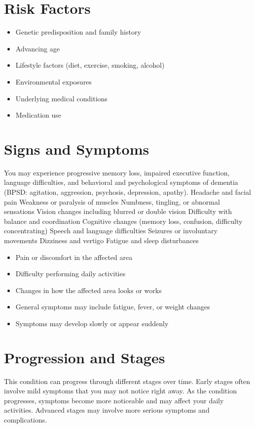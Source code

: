 \section{Risk Factors}

\begin{itemize}[noitemsep]
  \item Genetic predisposition and family history
  \item Advancing age
  \item Lifestyle factors (diet, exercise, smoking, alcohol)
  \item Environmental exposures
  \item Underlying medical conditions
  \item Medication use
\end{itemize}

\section{Signs and Symptoms}
You may experience progressive memory loss, impaired executive function, language difficulties, and behavioral and psychological symptoms of dementia (BPSD: agitation, aggression, psychosis, depression, apathy). Headache and facial pain Weakness or paralysis of muscles Numbness, tingling, or abnormal sensations Vision changes including blurred or double vision Difficulty with balance and coordination Cognitive changes (memory loss, confusion, difficulty concentrating) Speech and language difficulties Seizures or involuntary movements Dizziness and vertigo Fatigue and sleep disturbances

\begin{itemize}[noitemsep]
  \item Pain or discomfort in the affected area
  \item Difficulty performing daily activities
  \item Changes in how the affected area looks or works
  \item General symptoms may include fatigue, fever, or weight changes
  \item Symptoms may develop slowly or appear suddenly
\end{itemize}

\section{Progression and Stages}
This condition can progress through different stages over time. Early stages often involve mild symptoms that you may not notice right away. As the condition progresses, symptoms become more noticeable and may affect your daily activities. Advanced stages may involve more serious symptoms and complications.

